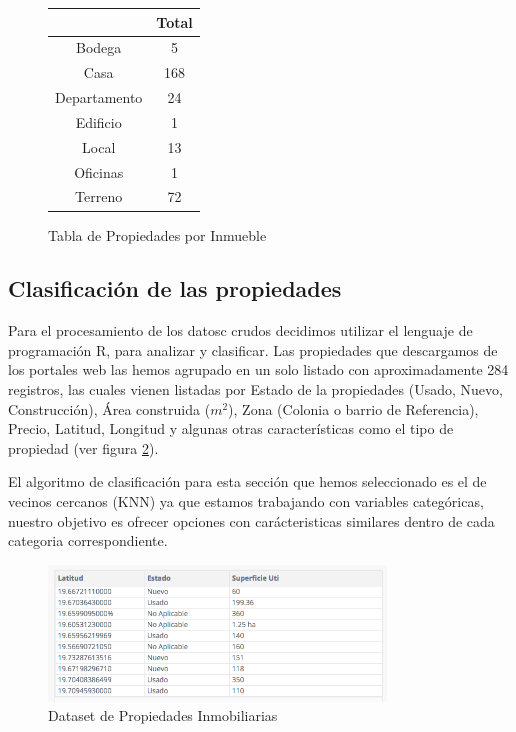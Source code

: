\begin{figure}[ht]
\centering
\begin{tabular}{cc}
  \hline
 & Total \\ 
  \hline
Bodega &   5 \\ 
  Casa & 168 \\ 
  Departamento &  24 \\ 
  Edificio &   1 \\ 
  Local &  13 \\ 
  Oficinas &   1 \\ 
  Terreno &  72 \\ 
   \hline
\end{tabular}
\caption{Tabla de Propiedades por Inmueble}
\label{fig:PropiedadesList}
\end{figure}

\subsection{Clasificación de las propiedades}
Para el procesamiento de los datosc crudos decidimos utilizar el lenguaje de programación R, para analizar y clasificar. Las propiedades que descargamos de los portales web las hemos agrupado en un solo listado con aproximadamente 284 registros, las cuales  vienen listadas por Estado de la propiedades (Usado, Nuevo, Construcción), Área construida ($m^2$), Zona (Colonia o barrio de Referencia), Precio, Latitud, Longitud y algunas otras características como el tipo de propiedad (ver figura \ref{fig:Dataset}). 


El algoritmo de clasificación para esta sección que hemos seleccionado es el de vecinos cercanos (KNN) ya que estamos trabajando con variables categóricas, nuestro objetivo es ofrecer opciones con carácteristicas similares dentro de cada categoria correspondiente.
\begin{figure}[ht]
\centering
\includegraphics[width=0.8\textwidth]{Dataset.png}
\caption{Dataset de Propiedades Inmobiliarias}
\label{fig:Dataset}
\end{figure}


